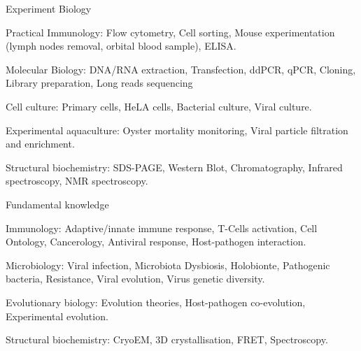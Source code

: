 \begin{cventries}
  \cventry
    {Experiment} %
    {Biology} %
    {} %
    {} %
    {
      \begin{cvitems} %
        \item {Practical Immunology: Flow cytometry, Cell sorting, Mouse experimentation (lymph nodes removal, orbital blood sample), ELISA.}
        \item {Molecular Biology: DNA/RNA extraction, Transfection, ddPCR, qPCR, Cloning, Library preparation, Long reads sequencing}
        \item {Cell culture: Primary cells, HeLA cells, Bacterial culture, Viral culture.}
        \item {Experimental aquaculture: Oyster mortality monitoring, Viral particle filtration and enrichment.}
        \item {Structural biochemistry: SDS-PAGE,  Western Blot, Chromatography, Infrared spectroscopy, NMR spectroscopy.}
      \end{cvitems}
    }

  \cventry
    {Fundamental knowledge} %
    {} %
    {} %
    {} %
    {
      \begin{cvitems} %
        \item {Immunology: Adaptive/innate immune response, T-Cells activation, Cell Ontology, Cancerology, Antiviral response, Host-pathogen interaction.}
        \item {Microbiology: Viral infection, Microbiota Dysbiosis, Holobionte, Pathogenic bacteria, Resistance, Viral evolution, Virus genetic diversity.}
        \item {Evolutionary biology: Evolution theories, Host-pathogen co-evolution, Experimental evolution.}
        \item {Structural biochemistry: CryoEM, 3D crystallisation, FRET, Spectroscopy.}
      \end{cvitems}
    }


\end{cventries}
